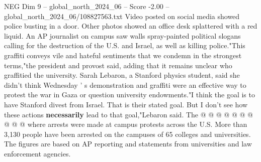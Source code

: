 \begin{textsample}{NEG Dim 9 – global\_north\_2024\_06 – Score -2.00 – global\_north\_2024\_06/108827563.txt}
Video posted on social media showed police busting in a door.
Other photos showed an office desk splattered with a red liquid.
An AP journalist on campus saw walls spray-painted political slogans calling for the destruction of the U.S. and Israel, as well as killing police."This graffiti conveys vile and hateful sentiments that we condemn in the strongest terms,"the president and provost said, adding that it remains unclear who graffitied the university.
Sarah Lebaron, a Stanford physics student, said she didn't think Wednesday ' s demonstration and graffiti were an effective way to protest the war in Gaza or question university endowments."I think the goal is to have Stanford divest from Israel.
That is their stated goal.
But I don't see how these actions \textbf{necessarily} lead to that goal,"Lebaron said.
The @ @ @ @ @ @ @ @ @ @ where arrests were made at campus protests across the U.S.
More than 3,130 people have been arrested on the campuses of 65 colleges and universities.
The figures are based on AP reporting and statements from universities and law enforcement agencies.

\end{textsample}
